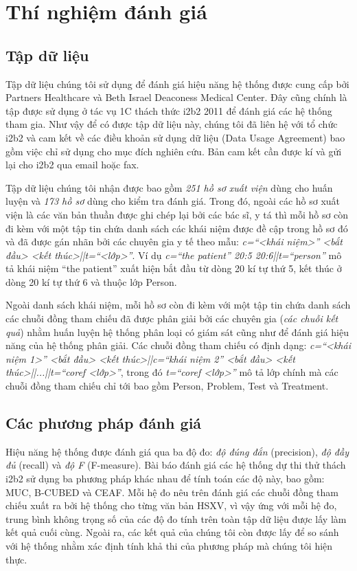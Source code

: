 \chapter{Thí nghiệm đánh giá}
\section{Tập dữ liệu}
Tập dữ liệu chúng tôi sử dụng để đánh giá hiệu năng hệ thống được cung cấp bởi Partners Healthcare và Beth Israel Deaconess Medical Center. Đây cũng chính là tập được sử dụng ở tác vụ 1C thách thức i2b2 2011 để đánh giá các hệ thống tham gia. Như vậy để có được tập dữ liệu này, chúng tôi đã liên hệ với tổ chức i2b2 và cam kết về các điều khoản sử dụng dữ liệu (Data Usage Agreement) bao gồm việc chỉ sử dụng cho mục đích nghiên cứu. Bản cam kết cần được kí và gửi lại cho i2b2 qua email hoặc fax.

Tập dữ liệu chúng tôi nhận được bao gồm \emph{251 hồ sơ xuất viện} dùng cho huấn luyện và \emph{173 hồ sơ} dùng cho kiểm tra đánh giá. Trong đó, ngoài các hồ sơ xuất viện là các văn bản thuần được ghi chép lại bởi các bác sĩ, y tá thì mỗi hồ sơ còn đi kèm với một tập tin chứa danh sách các khái niệm được đề cập trong hồ sơ đó và đã được gán nhãn bởi các chuyên gia y tế theo mẫu: \emph{c=``<khái niệm>'' <bắt đầu> <kết thúc>||t=``<lớp>''}. Ví dụ \emph{c=``the patient'' 20:5 20:6||t=``person''} mô tả khái niệm ``the patient'' xuất hiện bắt đầu từ dòng 20 kí tự thứ 5, kết thúc ở dòng 20 kí tự thứ 6 và thuộc lớp Person.

Ngoài danh sách khái niệm, mỗi hồ sơ còn đi kèm với một tập tin chứa danh sách các chuỗi đồng tham chiếu đã được phân giải bởi các chuyên gia (\emph{các chuỗi kết quả}) nhằm huấn luyện hệ thống phân loại có giám sát cũng như để đánh giá hiệu năng của hệ thống phân giải. Các chuỗi đồng tham chiếu có định dạng: \emph{c=``<khái niệm 1>'' <bắt đầu> <kết thúc>||c=``khái niệm 2'' <bắt đầu> <kết thúc>||...||t=``coref <lớp>''}, trong đó \emph{t=``coref <lớp>''} mô tả lớp chính mà các chuỗi đồng tham chiếu chỉ tới bao gồm Person, Problem, Test và Treatment.

\section{Các phương pháp đánh giá}
Hiệu năng hệ thống được đánh giá qua ba độ đo: \emph{độ đúng đắn} (precision), \emph{độ đầy đủ} (recall) và \emph{độ F} (F-measure). Bài báo đánh giá các hệ thống dự thi thử thách i2b2 sử dụng ba phương pháp khác nhau để tính toán các độ này, bao gồm: MUC, B-CUBED và CEAF. Mỗi hệ đo nêu trên đánh giá các chuỗi đồng tham chiếu xuất ra bởi hệ thống cho từng văn bản HSXV, vì vậy ứng với mỗi hệ đo, trung bình không trọng số của các độ đo tính trên toàn tập dữ liệu được lấy làm kết quả cuối cùng. Ngoài ra, các kết quả của chúng tôi còn được lấy để so sánh với hệ thống \cite{YanXu2012} nhằm xác định tính khả thi của phương pháp mà chúng tôi hiện thực.

